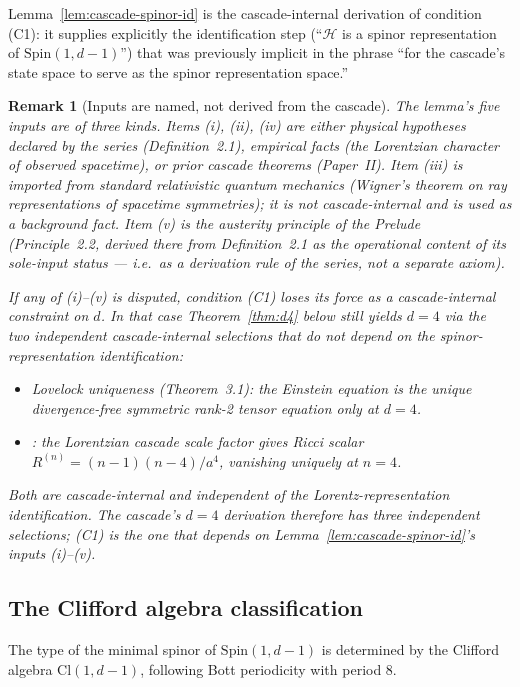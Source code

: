 \documentclass[12pt,a4paper]{article}
\newtheorem*{remark}{Remark}
\begin{document}
Lemma~\ref{lem:cascade-spinor-id} is the cascade-internal derivation of
condition (C1): it supplies explicitly the identification step
(``$\mathcal{H}$ is a spinor representation of $\mathrm{Spin}(1,d-1)$'')
that was previously implicit in the phrase ``for the cascade's state
space to serve as the spinor representation space.''

\begin{remark}[Inputs are named, not derived from the cascade]
\label{rem:sp-19-inputs}
The lemma's five inputs are of three kinds. Items (i), (ii), (iv) are
either physical hypotheses declared by the series (Definition~2.1),
empirical facts (the Lorentzian character of observed spacetime), or
prior cascade theorems (Paper~II). Item (iii) is imported from standard
relativistic quantum mechanics (Wigner's theorem on ray representations
of spacetime symmetries); it is not cascade-internal and is used as a
background fact. Item (v) is the austerity principle of the
Prelude (Principle~2.2, derived there from Definition~2.1 as the
operational content of its sole-input status --- i.e.\ as a derivation
rule of the series, not a separate axiom).

If any of (i)--(v) is disputed, condition (C1) loses its force as a
cascade-internal constraint on $d$. In that case Theorem~\ref{thm:d4}
below still yields $d=4$ via the two independent cascade-internal
selections that do not depend on the spinor-representation
identification:
\begin{itemize}
\item[(C2)] Lovelock uniqueness (Theorem~3.1): the Einstein equation
is the unique divergence-free symmetric rank-2 tensor equation only at
$d=4$.
\item[Corollary~\ref{cor:ricci-flat}]: the Lorentzian cascade scale
factor gives Ricci scalar $R^{(n)} = (n-1)(n-4)/a^4$, vanishing uniquely
at $n=4$.
\end{itemize}
Both are cascade-internal and independent of the Lorentz-representation
identification. The cascade's $d=4$ derivation therefore has three
independent selections; (C1) is the one that depends on
Lemma~\ref{lem:cascade-spinor-id}'s inputs (i)--(v).
\end{remark}

\subsection{The Clifford algebra classification}\label{sec:clifford-table}

The type of the minimal spinor of $\text{Spin}(1, d - 1)$ is determined by the Clifford algebra
$\text{Cl}(1, d - 1)$, following Bott periodicity with period 8.
\end{document}
